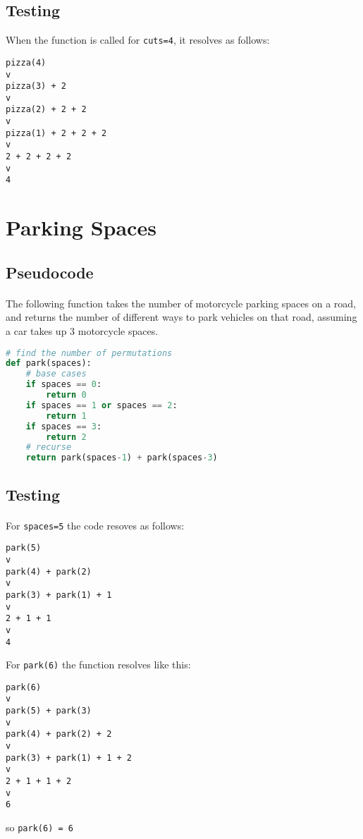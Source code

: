 \documentclass{report}
\begin{document}
\subsection*{Testing}
When the function is called for \texttt{cuts=4}, it resolves as follows:
\begin{lstlisting}
pizza(4)
v
pizza(3) + 2
v
pizza(2) + 2 + 2
v
pizza(1) + 2 + 2 + 2
v
2 + 2 + 2 + 2
v
4
\end{lstlisting}

\section*{Parking Spaces}
\subsection*{Pseudocode}
\paragraph{}
The following function takes the number of motorcycle parking spaces on a road, and returns the number of different ways to park vehicles on that road, assuming a car takes up 3 motorcycle spaces.

\begin{lstlisting}[language=Python]
# find the number of permutations
def park(spaces):
    # base cases
    if spaces == 0:
        return 0
    if spaces == 1 or spaces == 2:
        return 1
    if spaces == 3:
        return 2
    # recurse
    return park(spaces-1) + park(spaces-3)
\end{lstlisting}
\subsection*{Testing}
\paragraph{}
For \texttt{spaces=5} the code resoves as follows:
\begin{lstlisting}
park(5)
v
park(4) + park(2)
v
park(3) + park(1) + 1
v
2 + 1 + 1
v
4
\end{lstlisting}

For \texttt{park(6)} the function resolves like this:
\begin{lstlisting}
park(6)
v
park(5) + park(3)
v
park(4) + park(2) + 2
v
park(3) + park(1) + 1 + 2
v
2 + 1 + 1 + 2
v
6
\end{lstlisting}

so \texttt{park(6) = 6}
\end{document}
